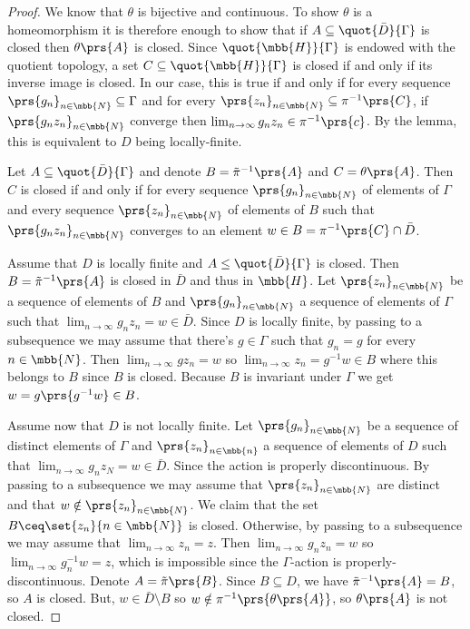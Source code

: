 \documentclass[10pt, twoside]{book}
\begin{document}
\begin{proof}
We know that $\theta$ is bijective and continuous. To show $\theta$ is a homeomorphism it is therefore enough to show that if $A \subseteq \quot{\bar{D}}{\Gamma}$ is closed then $\theta\prs{A}$ is closed.
Since $\quot{\mbb{H}}{\Gamma}$ is endowed with the quotient topology, a set $C \subseteq \quot{\mbb{H}}{\Gamma}$ is closed if and only if its inverse image is closed. In our case, this is true if and only if for every sequence $\prs{g_n}_{n \in \mbb{N}} \subseteq \Gamma$ and for every $\prs{z_n}_{n \in \mbb{N}} \subseteq \pi^{-1}\prs{C}$, if $\prs{g_n z_n}_{n \in \mbb{N}}$ converge then $\lim_{n\to\infty} g_n z_n \in \pi^{-1}\prs{c}$. By the lemma, this is equivalent to $D$ being locally-finite.

Let $A \subseteq \quot{\bar{D}}{\Gamma}$ and denote $B = \tilde{\pi}^{-1}\prs{A}$ and $C = \theta\prs{A}$. Then $C$ is closed if and only if for every sequence $\prs{g_n}_{n \in \mbb{N}}$ of elements of $\Gamma$ and every sequence $\prs{z_n}_{n \in \mbb{N}}$ of elements of $B$ such that $\prs{g_n z_n}_{n \in \mbb{N}}$ converges to an element $w \in B = \pi^{-1}\prs{C} \cap \bar{D}$.

Assume that $D$ is locally finite and $A \leq \quot{\bar{D}}{\Gamma}$ is closed. Then $B = \tilde{\pi}^{-1}\prs{A}$ is closed in $\bar{D}$ and thus in $\mbb{H}$. Let $\prs{z_n}_{n \in \mbb{N}}$ be a sequence of elements of $B$ and $\prs{g_n}_{n \in \mbb{N}}$ a sequence of elements of $\Gamma$ such that $\lim_{n\to\infty} g_n z_n = w \in \bar{D}$. Since $D$ is locally finite, by passing to a subsequence we may assume that there's $g \in \Gamma$ such that $g_n = g$ for every $n \in \mbb{N}$. Then $\lim_{n\to\infty} g z_n = w$ so $\lim_{n\to\infty} z_n = g^{-1} w \in B$ where this belongs to $B$ since $B$ is closed.
Because $B$ is invariant under $\Gamma$ we get $w = g\prs{g^{-1}w} \in B$.

Assume now that $D$ is not locally finite. Let $\prs{g_n}_{n \in \mbb{N}}$ be a sequence of distinct elements of $\Gamma$ and $\prs{z_n}_{n \in \mbb{n}}$ a sequence of elements  of $D$ such that $\lim_{n\to\infty} g_n z_N = w \in \bar{D}$. Since the action is properly discontinuous. By passing to a subsequence we may assume that $\prs{z_n}_{n \in \mbb{N}}$ are distinct and that $w \notin \prs{z_n}_{n \in \mbb{N}}$.
We claim that the set $B \ceq \set{z_n}{n \in \mbb{N}}$ is closed. Otherwise, by passing to a subsequence we may assume that $\lim_{n\to\infty} z_n = z$.
Then $\lim_{n\to\infty} g_n z_n = w$ so $\lim_{n\to\infty} g_n^{-1} w = z$, which is impossible since the $\Gamma$-action is properly-discontinuous. Denote $A = \tilde{\pi}\prs{B}$. Since $B \subseteq D$, we have $\tilde{\pi}^{-1}\prs{A} = B$, so $A$ is closed. But, $w \in \bar{D} \setminus B$ so $w \notin \pi^{-1}\prs{\theta\prs{A}}$, so $\theta\prs{A}$ is not closed.
\end{proof}
\end{document}
